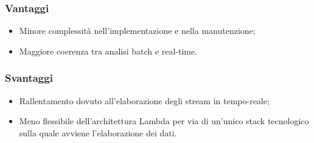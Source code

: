 \documentclass[8pt]{article}
\begin{document}
\subsubsection{Vantaggi}
\begin{itemize}
    \item Minore complessità nell'implementazione e nella manutenzione;
    \item Maggiore coerenza tra analisi batch e real-time.
\end{itemize}
\subsubsection{Svantaggi}
\begin{itemize}
    \item Rallentamento dovuto all'elaborazione degli stream in tempo-reale;
    \item Meno flessibile dell'architettura Lambda per via di un'unico stack tecnologico sulla quale avviene l'elaborazione dei dati.
\end{itemize}
\end{document}
